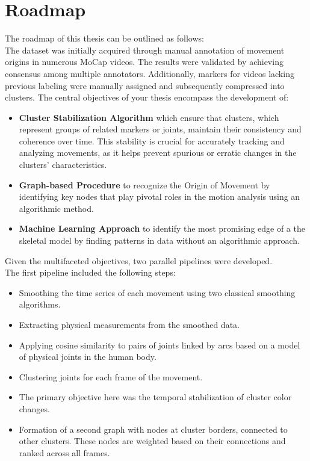 \section{Roadmap}
The roadmap of this thesis can be outlined as follows: \\
The dataset was initially acquired through manual annotation of movement origins in numerous MoCap videos. 
The results were validated by achieving consensus among multiple annotators. 
Additionally, markers for videos lacking previous labeling were manually assigned and subsequently compressed into clusters.
The central objectives of your thesis encompass the development of:
\begin{itemize}
    \item \textbf{Cluster Stabilization Algorithm} which ensure that clusters, which represent groups of related markers or joints, maintain their consistency and coherence over time. 
    This stability is crucial for accurately tracking and analyzing movements, as it helps prevent spurious or erratic changes in the clusters' characteristics.
    \item \textbf{Graph-based Procedure} to recognize the Origin of Movement by identifying key nodes that play pivotal roles in the motion analysis using an algorithmic method.
    \item \textbf{Machine Learning Approach} to identify the most promising edge of a the skeletal model by finding patterns in data without an algorithmic approach.
\end{itemize}
Given the multifaceted objectives, two parallel pipelines were developed.\\
The first pipeline included the following steps:
\begin{itemize}
    \item Smoothing the time series of each movement using two classical smoothing algorithms.
    \item Extracting physical measurements from the smoothed data.
    \item Applying cosine similarity to pairs of joints linked by arcs based on a model of physical joints in the human body.
    \item Clustering joints for each frame of the movement.
    \item The primary objective here was the temporal stabilization of cluster color changes.
    \item Formation of a second graph with nodes at cluster borders, connected to other clusters. These nodes are weighted based on their connections and ranked across all frames.
\end{itemize}
